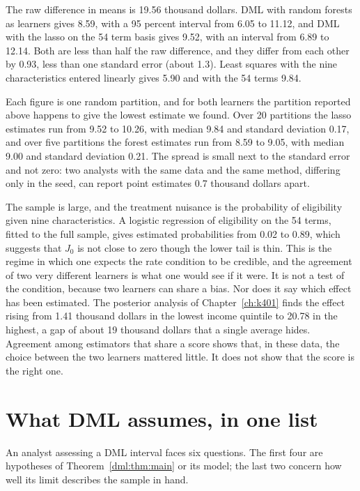 The raw difference in means is 19.56 thousand dollars. DML with random forests as learners gives 8.59, with a 95 percent interval from 6.05 to 11.12, and DML with the lasso on the 54 term basis gives 9.52, with an interval from 6.89 to 12.14. Both are less than half the raw difference, and they differ from each other by 0.93, less than one standard error (about 1.3). Least squares with the nine characteristics entered linearly gives 5.90 and with the 54 terms 9.84.

Each figure is one random partition, and for both learners the partition reported above happens to give the lowest estimate we found. Over 20 partitions the lasso estimates run from 9.52 to 10.26, with median 9.84 and standard deviation 0.17, and over five partitions the forest estimates run from 8.59 to 9.05, with median 9.00 and standard deviation 0.21. The spread is small next to the standard error and not zero: two analysts with the same data and the same method, differing only in the seed, can report point estimates 0.7 thousand dollars apart.

The sample is large, and the treatment nuisance is the probability of eligibility given nine characteristics. A logistic regression of eligibility on the 54 terms, fitted to the full sample, gives estimated probabilities from 0.02 to 0.89, which suggests that $J_0$ is not close to zero though the lower tail is thin. This is the regime in which one expects the rate condition to be credible, and the agreement of two very different learners is what one would see if it were. It is not a test of the condition, because two learners can share a bias. Nor does it say which effect has been estimated. The posterior analysis of Chapter~\ref{ch:k401} finds the effect rising from 1.41 thousand dollars in the lowest income quintile to 20.78 in the highest, a gap of about 19 thousand dollars that a single average hides. Agreement among estimators that share a score shows that, in these data, the choice between the two learners mattered little. It does not show that the score is the right one.

\section{What DML assumes, in one list}\label{sec:dml:assume}

An analyst assessing a DML interval faces six questions. The first four are hypotheses of Theorem~\ref{dml:thm:main} or its model; the last two concern how well its limit describes the sample in hand.

